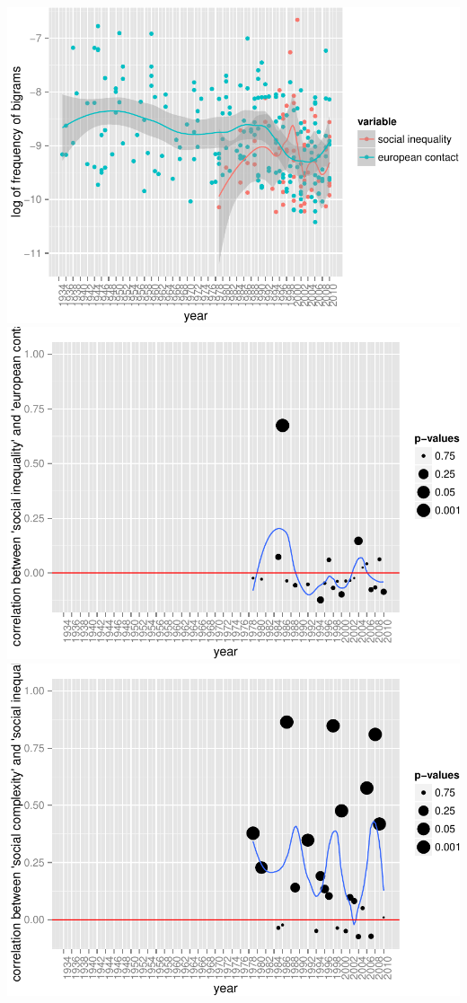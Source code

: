 \documentclass[10pt]{article}
\newenvironment{CodeChunk}{}{}
\begin{document}
\begin{CodeChunk}

\includegraphics{509Assignment_files/figure-latex/bigrams-1} 
\includegraphics{509Assignment_files/figure-latex/bigrams-2} 
\includegraphics{509Assignment_files/figure-latex/bigrams-3} \end{CodeChunk}
\end{document}
